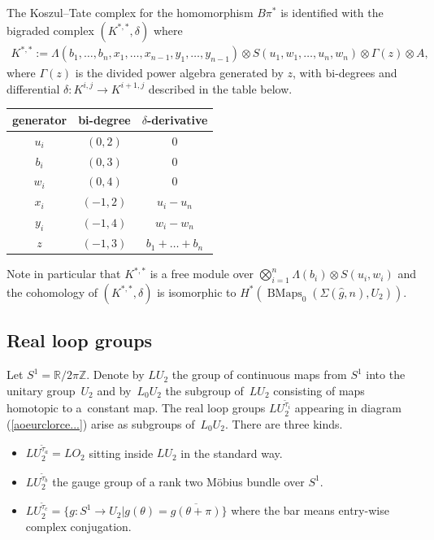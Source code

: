 \documentclass[pdftex]{sigma}
\numberwithin{equation}{section}
\begin{document}
The Koszul--Tate complex for the homomorphism $B\pi^*$ is identif\/ied with the bigraded complex $(K^{*,*},\delta)$ where
\begin{gather}\label{ktc}
 K^{*,*} := \Lambda(b_1,\dots,b_n, x_1,\dots,x_{n-1}, y_1,\dots,y_{n-1}) \otimes S(u_1,w_1,\dots, u_n,w_n) \otimes \Gamma(z)
\otimes A,
\end{gather}
where $\Gamma(z)$ is the divided power algebra generated by $z$, with bi-degrees and dif\/ferential $\delta\colon K^{i,j} \! \rightarrow K^{i+1, j}$ described in the table below.
\begin{center}
\begin{tabular}{|c|c|c|}
	\hline
generator & bi-degree & $\delta$-derivative \\
\hline
$u_i$ & $(0,2)$ & $0$ \\
$b_i$ & $(0,3)$ & $0$ \\
$w_i$ & $(0,4)$ & $0$\\
$x_i$ & $(-1,2)$ & $u_{i}-u_{n}$ \\
$y_i$ & $(-1,4)$ & $w_{i} -w_{n}$\\
$z$ & $(-1,3)$ & $b_1 +\dots+ b_n$\\
\hline
\end{tabular}
\end{center}

Note in particular that $K^{*,*}$ is a free module over $\bigotimes_{i=1}^n \Lambda(b_i) \otimes S(u_i, w_i)$ and the cohomology of $(K^{*,*},\delta) $ is isomorphic to $H^*(\operatorname{BMaps}_0(\Sigma(\hat{g}, n), U_2))$.

\subsection{Real loop groups}\label{orlecbularc}

Let $S^1 = {\mathbb R}/2\pi{\mathbb Z}$. Denote by $LU_2$ the group of continuous maps from $S^1$ into the unitary group~$U_2$ and by~$L_0U_2$ the subgroup of~$LU_2$ consisting of maps homotopic to a~constant map. The real loop groups $LU_2^{{\tilde{\tau}}_i}$ appearing in diagram (\ref{aoeurclorce...}) arise as subgroups of~$L_0U_2$. There are three kinds.
\begin{itemize}\itemsep=0pt
\item[(a)] $LU_2^{{\tilde{\tau}}_a} = LO_2$ sitting inside $LU_2$ in the standard way.
\item[(b)] $LU_2^{{\tilde{\tau}}_b}$ the gauge group of a rank two M\"obius bundle over $S^1$.
\item[(c)] $LU_2^{{\tilde{\tau}}_c} = \{ g\colon S^1 \rightarrow U_2 | g(\theta) = \overline{g(\theta + \pi)}\}$ where the bar means entry-wise complex conjugation.
\end{itemize}
\end{document}
